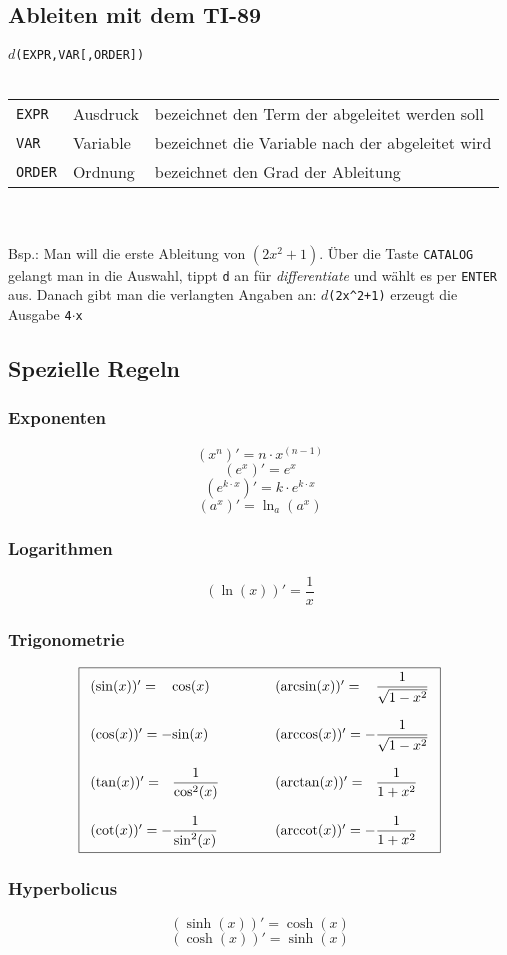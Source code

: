 \subsection{Ableiten mit dem TI-89}
$d$\verb?(EXPR,VAR[,ORDER])?\\\\
\begin{tabular}{@{}lll}
\verb?EXPR?	& Ausdruck	& bezeichnet den Term der abgeleitet werden soll \\
\verb?VAR?	& Variable	& bezeichnet die Variable nach der abgeleitet wird \\
\verb?ORDER?	& Ordnung	& bezeichnet den Grad der Ableitung \\
\end{tabular}\\\\
Bsp.: Man will die erste Ableitung von $(2x^2 + 1)$. Über die Taste \verb?CATALOG? gelangt man in die Auswahl, tippt \verb?d? an für \textit{differentiate} und wählt es per \verb?ENTER? aus. Danach gibt man die verlangten Angaben an: $d$\verb?(2x^2+1)? erzeugt die Ausgabe \verb?4?$\cdot$\verb?x?
\fi
\newpage

\subsection{Spezielle Regeln}

\subsubsection{Exponenten}
\[ \boxed{ (x^n)' = n\cdot x^{(n-1)} } \]
\[ \boxed{ (e^x)' = e^x } \]
\[ \boxed{ (e^{k\cdot x})' = k \cdot e^{k\cdot x} } \]
\[ \boxed{ (a^x)' = \ln_a (a^x) } \]

\subsubsection{Logarithmen}
\[ \boxed{ (\ln(x))' = \frac{1}{x} } \]  

\subsubsection{Trigonometrie}

\[ \boxed{ \begin{array}{ l @{}l @{\quad\quad\quad}l @{}l }
(\sin(x))' =   &\cos(x)             & \quad (\arcsin(x))' =   & \dfrac{1}{\sqrt{1 - x^2}} \\\\
(\cos(x))' = - &\sin(x)             & \quad (\arccos(x))' = - & \dfrac{1}{\sqrt{1 - x^2}} \\\\
(\tan(x))' =   &\dfrac{1}{\cos^2(x)} & \quad (\arctan(x))' =   & \dfrac{1}{1 + x^2} \\\\
(\cot(x))' = - &\dfrac{1}{\sin^2(x)} & \quad (\arccot(x))' = - & \dfrac{1}{1 + x^2} 
\end{array}} \]

\subsubsection{Hyperbolicus}
\[ \boxed{(\sinh(x))' = \cosh(x)} \]
\[ \boxed{(\cosh(x))' = \sinh(x)} \]
